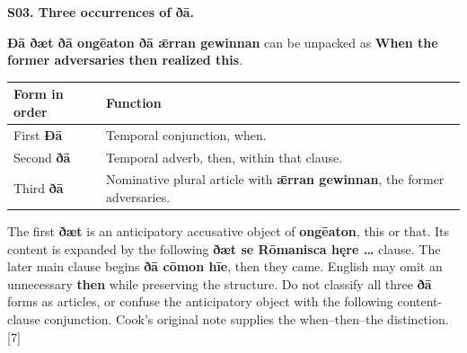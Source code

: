 \par\begin{minipage}{\linewidth}\raggedright
\textbf{S03. Three occurrences of ðā.}

\textbf{Ðā ðæt ðā ongēaton ðā ǣrran gewinnan} can be unpacked as \textbf{When the former adversaries then realized this}.

\par\begingroup
\fontsize{10.5}{13.2}\selectfont
\setlength{\LTleft}{0pt}\setlength{\LTright}{\fill}
\noindent
\begin{tabular}{@{}>{\raggedright\arraybackslash}p{25.2mm}>{\raggedright\arraybackslash}p{95.99mm}@{}}
\toprule
\textbf{Form in order} & \textbf{Function} \\
\midrule
First \textbf{Ðā} & Temporal conjunction, when. \\
Second \textbf{ðā} & Temporal adverb, then, within that clause. \\
Third \textbf{ðā} & Nominative plural article with \textbf{ǣrran gewinnan}, the former adversaries. \\
\bottomrule
\end{tabular}
\par\endgroup

The first \textbf{ðæt} is an anticipatory accusative object of \textbf{ongēaton}, this or that. Its content is expanded by the following \textbf{ðæt se Rōmanisca hęre …} clause. The later main clause begins \textbf{ðā cōmon hīe}, then they came. English may omit an unnecessary \textbf{then} while preserving the structure. Do not classify all three \textbf{ðā} forms as articles, or confuse the anticipatory object with the following content-clause conjunction. Cook's original note supplies the when–then–the distinction. [7]

\end{minipage}\par\addvspace{4pt}

